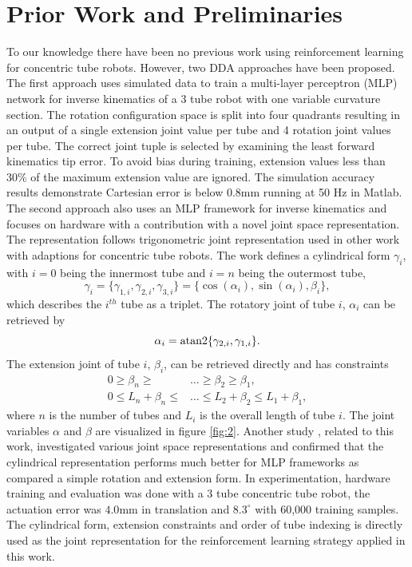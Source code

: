\section{Prior Work and Preliminaries}
\label{prelims}
To our knowledge there have been no previous work using reinforcement learning for concentric tube robots. However, two DDA approaches have been proposed. The first approach \cite{Bergeles2015} uses simulated data to train a multi-layer perceptron (MLP) network for inverse kinematics of a 3 tube robot with one variable curvature section. The rotation configuration space is split into four quadrants resulting in an output of a single extension joint value per tube and 4 rotation joint values per tube. The correct joint tuple is selected by examining the least forward kinematics tip error. To avoid bias during training, extension values less than 30\% of the maximum extension value are ignored. The simulation accuracy results demonstrate Cartesian error is below 0.8mm running at 50 Hz in Matlab. The second approach \cite{Grassmann2018} also uses an MLP framework for inverse kinematics and focuses on hardware with a contribution with a novel joint space representation. The representation follows trigonometric joint representation used in other work \cite{jordan1992forward} with adaptions for concentric tube robots. The work defines a cylindrical form $\gamma_i$, with $i=0$ being the innermost tube and $i=n$ being the outermost tube,
\begin{equation}
\gamma_i = \{ \gamma_{1,i}, \gamma_{2,i}, \gamma_{3,i} \} = \{ \cos(\alpha_i), \sin(\alpha_i), \beta_i \},\label{eqn:cylindrical-representation}
\end{equation}
which describes the $i^{th}$ tube as a triplet. The rotatory joint of tube $i$,  $\alpha_i$ can be retrieved by
\begin{equation}
\alpha_i = \textnormal{atan2} \{ \gamma_{2,i}, \gamma_{1,i} \}. \label{eqn:alpha}
\end{equation}
The extension joint of tube $i$, $\beta_i$, can be retrieved directly and has constraints
\begin{align}
0 \geq \beta_n \geq & \dots \geq \beta_2 \geq \beta_1, \label{eqn:beta-constraints} \\
0 \leq L_n + \beta_n \leq & \dots \leq L_2 + \beta_2 \leq L_1 + \beta_1, \label{eqn:extension-constraints}
\end{align}
where $n$ is the number of tubes and $L_i$ is the overall length of tube $i$. The joint variables $\alpha$ and $\beta$ are visualized in figure \ref{fig:2}. Another study \cite{Grassmann2019}, related to this work, investigated various joint space representations and confirmed that the cylindrical representation performs much better for MLP frameworks as compared a simple rotation and extension form. In experimentation, hardware training and evaluation was done with a 3 tube concentric tube robot, the actuation error was $4.0$mm in translation and $8.3 ^{\circ}$ with 60,000 training samples. The cylindrical form, extension constraints and order of tube indexing is directly used as the joint representation for the reinforcement learning strategy applied in this work.

